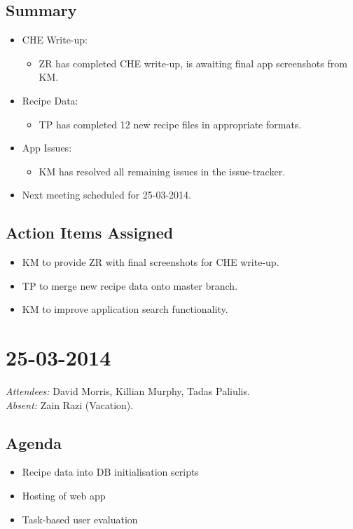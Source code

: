\documentclass{article}
\begin{document}
\subsection*{Summary}
\begin{itemize}
\item CHE Write-up:
  \begin{itemize}
  \item ZR has completed CHE write-up, is awaiting final app screenshots from KM.
  \end{itemize}
\item Recipe Data:
  \begin{itemize}
  \item TP has completed 12 new recipe files in appropriate formats.
  \end{itemize}
\item App Issues:
  \begin{itemize}
  \item KM has resolved all remaining issues in the issue-tracker.
  \end{itemize}
\item Next meeting scheduled for 25-03-2014.
\end{itemize}

\subsection*{Action Items Assigned}
\begin{itemize}
\item KM to provide ZR with final screenshots for CHE write-up.
\item TP to merge new recipe data onto master branch.
\item KM to improve application search functionality.
\end{itemize}


\clearpage

\section*{25-03-2014}
\vspace{0.5cm}
\emph{Attendees: }David Morris, Killian Murphy, Tadas Paliulis.
\\
\emph{Absent: }Zain Razi (Vacation).

\subsection*{Agenda}
\begin{itemize}
\item Recipe data into DB initialisation scripts
\item Hosting of web app
\item Task-based user evaluation
\end{itemize}
\end{document}
